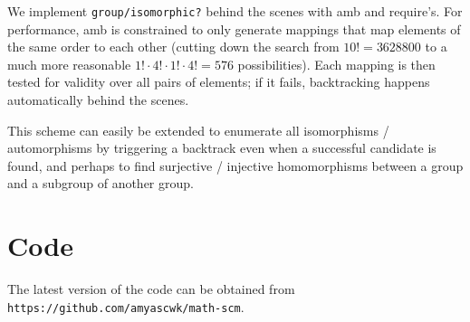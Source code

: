 \documentclass{article}
\begin{document}
		We implement \texttt{group/isomorphic?} behind the scenes with amb and require's. For performance, amb is constrained to only generate mappings that map elements of the same order to each other (cutting down the search from $10! = 3628800$ to a much more reasonable $1! \cdot 4! \cdot 1! \cdot 4! = 576$ possibilities). Each mapping is then tested for validity over all pairs of elements; if it fails, backtracking happens automatically behind the scenes.
		
		This scheme can easily be extended to enumerate all isomorphisms / automorphisms by triggering a backtrack even when a successful candidate is found, and perhaps to find surjective / injective homomorphisms between a group and a subgroup of another group.    
    \section{Code}
        
        The latest version of the code can be obtained from \texttt{https://github.com/amyascwk/math-scm}.
        
    
\end{document}
